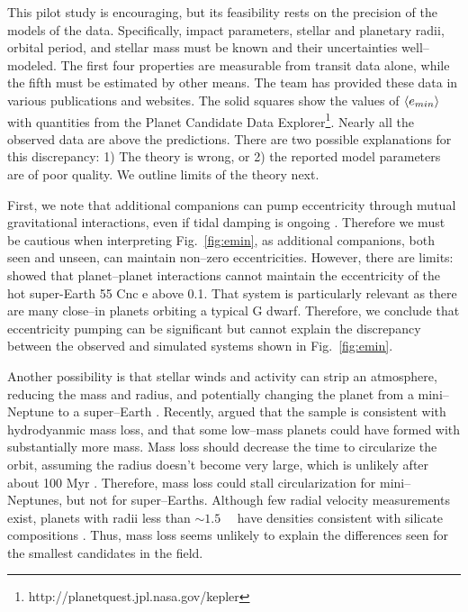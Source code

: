 This pilot study is encouraging, but its feasibility rests on the
precision of the models of the \kepler data.  Specifically, impact
parameters, stellar and planetary radii, orbital period, and stellar
mass must be known and their uncertainties well--modeled.  The first
four properties are measurable from transit data alone, while the
fifth must be estimated by other means.  The \kepler team has provided
these data in various publications and websites.  The solid squares
show the values of $\left< e_{min} \right>$ with quantities from the
\kepler Planet Candidate Data
Explorer\footnote{http://planetquest.jpl.nasa.gov/kepler}.  Nearly all
the observed data are above the predictions. There are two possible
explanations for this discrepancy: 1) The theory is wrong, or 2) the
reported model parameters are of poor quality.  We outline limits of
the theory next.

\medskip
{\centerline{}}
\smallskip

First, we note that additional companions can pump eccentricity
through mutual gravitational interactions, even if tidal damping is
ongoing \citep{MardlingLin02,Bolmont13}.  Therefore we must be
cautious when interpreting Fig.~\ref{fig:emin}, as additional
companions, both seen and unseen, can maintain non--zero
eccentricities.  However, there are limits: \cite{Bolmont13} showed
that planet--planet interactions cannot maintain the eccentricity of
the hot super-Earth 55 Cnc e above 0.1.  That system is particularly relevant as there are
many close--in planets orbiting a typical G dwarf.  Therefore, we conclude
that eccentricity pumping can be significant but cannot explain the discrepancy between the observed and simulated systems shown in Fig.~\ref{fig:emin}.

Another possibility is that stellar winds and activity can strip an
atmosphere, reducing the mass and radius, and potentially changing the
planet from a mini--Neptune to a super--Earth
\citep{Jackson10,Valencia10,Leitzinger11,Poppenhaeger12}.  Recently,
\cite{OwenWu13} argued that the \kepler sample is consistent with
hydrodyanmic mass loss, and that some low--mass planets could have
formed with substantially more mass.  Mass loss should decrease the
time to circularize the orbit, assuming the radius doesn't become very
large, which is unlikely after about 100 Myr \citep{Lopez12}.
Therefore, mass loss could stall circularization for mini--Neptunes,
but not for super--Earths.  Although few radial velocity measurements
exist, planets with radii less than $\sim 1.5$~\rearth~ have densities
consistent with silicate compositions \citep{Batalha11}.  Thus, mass
loss seems unlikely to explain the differences seen for the smallest
candidates in the \kepler field.

